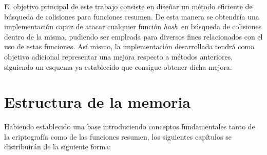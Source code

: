 \documentclass[12pt,spanish,listoffigures,listoftables,listofalgorithms]{tfgetsinf}
\newcommand{\hash}{\textit{hash}}
\begin{document}
El objetivo principal de este trabajo consiste en diseñar un método eficiente de búsqueda de colisiones para funciones resumen. De esta manera se obtendría una implementación capaz de atacar cualquier función \hash~en búsqueda de colisiones dentro de la misma, pudiendo ser empleada para diversos fines relacionados con el uso de estas funciones. Así mismo, la implementación desarrollada tendrá como objetivo adicional representar una mejora respecto a métodos anteriores, siguiendo un esquema ya establecido que consigue obtener dicha mejora.


\section{Estructura de la memoria}

Habiendo establecido una base introduciendo conceptos fundamentales tanto de la criptografía como de las funciones resumen, los siguientes capítulos se distribuirán de la siguiente forma:
\end{document}
